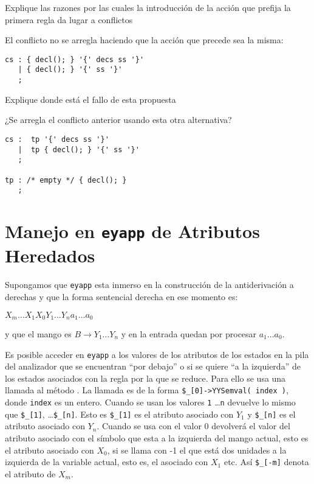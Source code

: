 \begin{exercise}
Explique las razones por las cuales la introducción de la acción que prefija
la primera regla da lugar a conflictos
\end{exercise}

\begin{exercise}
El conflicto no se arregla haciendo 
que la acción que precede sea la misma:
\begin{verbatim}
cs : { decl(); } '{' decs ss '}' 
   | { decl(); } '{' ss '}' 
   ;
\end{verbatim}
Explique donde está el fallo de esta propuesta
\end{exercise}

\begin{exercise}
¿Se arregla el conflicto anterior usando esta otra alternativa?

\begin{verbatim}
cs :  tp '{' decs ss '}' 
   |  tp { decl(); } '{' ss '}' 
   ;
   
tp : /* empty */ { decl(); }
   ;
\end{verbatim}
\end{exercise}

\section{Manejo en {\tt eyapp} de Atributos Heredados}
\label{section:heredados}
Supongamos  que \verb|eyapp| esta inmerso 
en la construcción de la antiderivación a derechas y que la forma sentencial
derecha en ese momento es:

\begin{center}
$X_m \ldots X_1 X_0 Y_1 \ldots  Y_n a_1 \ldots a_0$
\end{center}

y que el mango es $B \rightarrow Y_1 \ldots  Y_n$ y en la entrada quedan por 
procesar $a_1 \ldots a_0$.

Es posible acceder en \verb|eyapp| a los valores de los atributos de los estados en la pila
del analizador que se encuentran ``por debajo'' o si se quiere
``a la izquierda'' de los estados asociados
con la regla por la que se reduce. Para ello se usa una llamada al método
. La llamada es de la forma 
\verb|$_[0]->YYSemval( index )|, donde \verb|index| es un entero.
Cuando se usan los valores \verb|1| \ldots \verb|n| devuelve lo mismo
que \verb|$_[1]|, \ldots \verb|$_[n]|. Esto es 
\verb|$_[1]| es el atributo asociado con $Y_1$ y \verb|$_[n]| es el atributo
asociado con $Y_n$.  Cuando se usa con el valor
0 devolverá el valor del atributo asociado con el símbolo que esta a la izquierda 
del mango actual, esto es el atributo asociado con $X_0$, 
si se llama con -1 el que está dos unidades a la izquierda de la variable actual, 
esto es, el asociado con $X_1$ etc. Así \verb|$_[-m]| denota el atributo
de $X_m$.

